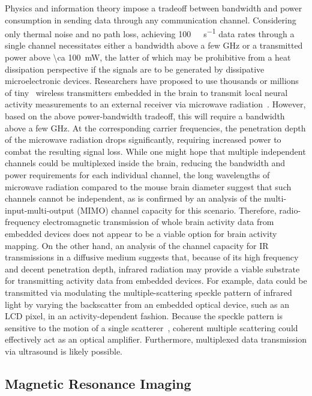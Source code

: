 Physics and information theory impose a tradeoff between bandwidth and power consumption in sending data through any communication channel.
Considering only thermal noise and no path loss, achieving \SI{100}{\giga\bit\per\second} data rates through a single channel necessitates either a bandwidth above a few \si{\giga\hertz} or a transmitted power above \SI{\ca 100}{\milli\watt}, the latter of which may be prohibitive from a heat dissipation perspective if the signals are to be generated by dissipative microelectronic devices.
Researchers have proposed to use thousands or millions of tiny~\cite{gomez10} wireless transmitters embedded in the brain to transmit local neural activity measurements to an external receiver via microwave radiation~\cite{dyson09}.
However, based on the above power-bandwidth tradeoff, this will require a bandwidth above a few \si{\giga\hertz}.
At the corresponding carrier frequencies, the penetration depth of the microwave radiation drops significantly, requiring increased power to combat the resulting signal loss.
While one might hope that multiple independent channels could be multiplexed inside the brain, reducing the bandwidth and power requirements for each individual channel, the long wavelengths of microwave radiation compared to the mouse brain diameter suggest that such channels cannot be independent, as is confirmed by an analysis of the multi-input-multi-output (MIMO) channel capacity for this scenario.
Therefore, radio-frequency electromagnetic transmission of whole brain activity data from embedded devices does not appear to be a viable option for brain activity mapping.
On the other hand, an analysis of the channel capacity for IR transmissions in a diffusive medium suggests that, because of its high frequency and decent penetration depth, infrared radiation may provide a viable substrate for transmitting activity data from embedded devices.
For example, data could be transmitted via modulating the multiple-scattering speckle pattern of infrared light by varying the backscatter from an embedded optical device, such as an LCD pixel, in an activity-dependent fashion.
Because the speckle pattern is sensitive to the motion of a single scatterer~\cite{berkovits91}, coherent multiple scattering could effectively act as an optical amplifier. Furthermore, multiplexed data transmission via ultrasound is likely possible.

\subsection{Magnetic Resonance Imaging}


